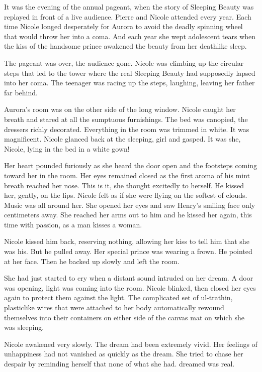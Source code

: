 \documentclass[]{article}
\begin{document}
{It was the evening of the annual pageant, when the story of Sleeping Beauty was replayed in front of a live audience.  Pierre and Nicole attended every year.  Each time Nicole longed desperately for Aurora to avoid the deadly spinning wheel that would throw her into a coma.  And each year she wept adolescent tears when the kiss of the handsome prince awakened the beauty from her deathlike sleep.

The pageant was over, the audience gone.  Nicole was climbing up the circular steps that led to the tower where the real Sleeping Beauty had supposedly lapsed into her coma.  The teenager was racing up the steps, laughing, leaving her father far behind.

Aurora’s room was on the other side of the long window.  Nicole caught her breath and stared at all the sumptuous furnishings.  The bed was canopied, the dressers richly decorated.  Everything in the room was trimmed in white.  It was magnificent.  Nicole glanced back at the sleeping, girl and gasped.  It was she, Nicole, lying in the bed in a white gown!

Her heart pounded furiously as she heard the door open and the footsteps coming toward her in the room.  Her eyes remained closed as the first aroma of his mint breath reached her nose.  This is it, she thought excitedly to herself.  He kissed her, gently, on the lips.  Nicole felt as if she were flying on the softest of clouds.  Music was all around her.  She opened her eyes and saw Henry’s smiling face only centimeters away.  She reached her arms out to him and he kissed her again, this time with passion, as a man kisses a woman.

Nicole kissed him back, reserving nothing, allowing her kiss to tell him that she was his.  But he pulled away.  Her special prince was wearing a frown.  He pointed at her face.  Then he backed up slowly and left the room.

She had just started to cry when a distant sound intruded on her dream.  A door was opening, light was coming into the room.  Nicole blinked, then closed her eyes again to protect them against the light.  The complicated set of ul-trathin, plasticlike wires that were attached to her body automatically rewound themselves into their containers on either side of the canvas mat on which she was sleeping.

Nicole awakened very slowly.  The dream had been extremely vivid.  Her feelings of unhappiness had not vanished as quickly as the dream.  She tried to chase her despair by reminding herself that none of what she had.  dreamed was real.

}
\end{document}
